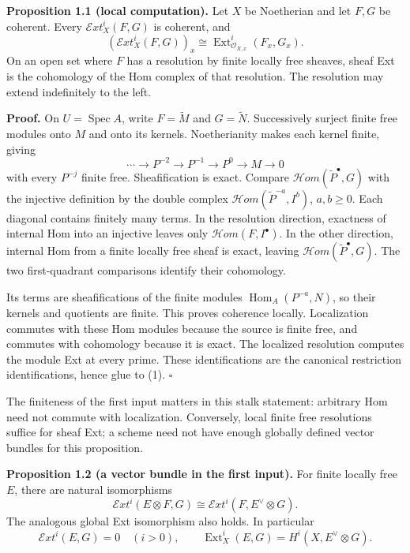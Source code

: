 \documentclass[11pt]{article}
\begin{document}
\textbf{Proposition 1.1 (local computation).} Let \(X\) be Noetherian
and let \(F,G\) be coherent. Every \(\mathcal E xt^i_X(F,G)\) is
coherent, and \[
(\mathcal E xt^i_X(F,G))_x
 \cong \operatorname{Ext}^i_{\mathcal O_{X,x}}(F_x,G_x).
\tag{1}
\] On an open set where \(F\) has a resolution by finite locally free
sheaves, sheaf Ext is the cohomology of the Hom complex of that
resolution. The resolution may extend indefinitely to the left.

\textbf{Proof.} On \(U=\operatorname{Spec}A\), write \(F=\widetilde M\)
and \(G=\widetilde N\). Successively surject finite free modules onto
\(M\) and onto its kernels. Noetherianity makes each kernel finite,
giving \[
\cdots\longrightarrow P^{-2}\longrightarrow P^{-1}
 \longrightarrow P^0\longrightarrow M\longrightarrow0
\] with every \(P^{-j}\) finite free. Sheafification is exact. Compare
\(\mathcal H om(\widetilde P^\bullet,G)\) with the injective definition
by the double complex \(\mathcal H om(\widetilde P^{-a},I^b)\),
\(a,b\geq0\). Each diagonal contains finitely many terms. In the
resolution direction, exactness of internal Hom into an injective leaves
only \(\mathcal H om(F,I^\bullet)\). In the other direction, internal
Hom from a finite locally free sheaf is exact, leaving
\(\mathcal H om(\widetilde P^\bullet,G)\). The two first-quadrant
comparisons identify their cohomology.

Its terms are sheafifications of the finite modules
\(\operatorname{Hom}_A(P^{-a},N)\), so their kernels and quotients are
finite. This proves coherence locally. Localization commutes with these
Hom modules because the source is finite free, and commutes with
cohomology because it is exact. The localized resolution computes the
module Ext at every prime. These identifications are the canonical
restriction identifications, hence glue to (1). \(\square\)

The finiteness of the first input matters in this stalk statement:
arbitrary Hom need not commute with localization. Conversely, local
finite free resolutions suffice for sheaf Ext; a scheme need not have
enough globally defined vector bundles for this proposition.

\textbf{Proposition 1.2 (a vector bundle in the first input).} For
finite locally free \(E\), there are natural isomorphisms \[
\mathcal E xt^i(E\otimes F,G)
 \cong\mathcal E xt^i(F,E^\vee\otimes G).
\tag{2}
\] The analogous global Ext isomorphism also holds. In particular \[
\mathcal E xt^{i}(E,G)=0\quad(i>0),
\qquad
\operatorname{Ext}^i_X(E,G)
 =H^i(X,E^\vee\otimes G).
\tag{3}
\]
\end{document}
